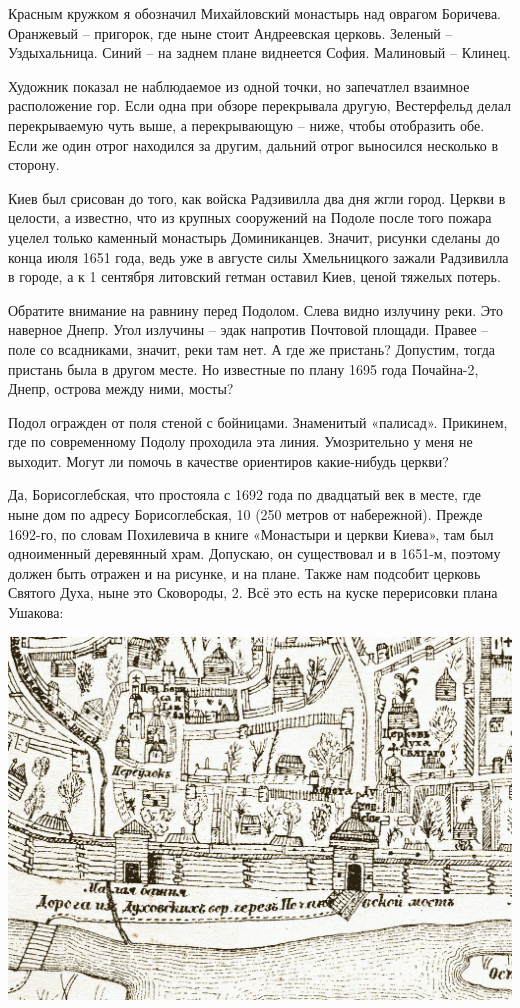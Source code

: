 Красным кружком я обозначил Михайловский монастырь над оврагом Боричева. Оранжевый – пригорок, где ныне стоит Андреевская церковь. Зеленый – Уздыхальница. Синий – на заднем плане виднеется София. Малиновый – Клинец.

Художник показал не наблюдаемое из одной точки, но запечатлел взаимное расположение гор. Если одна при обзоре перекрывала другую, Вестерфельд делал перекрываемую чуть выше, а перекрывающую – ниже, чтобы отобразить обе. Если же один отрог находился за другим, дальний отрог выносился несколько в сторону.

Киев был срисован до того, как войска Радзивилла два дня жгли город. Церкви в целости, а известно, что из крупных сооружений на Подоле после того пожара уцелел только каменный монастырь Доминиканцев. Значит, рисунки сделаны до конца июля 1651 года, ведь уже в августе силы Хмельницкого зажали Радзивилла в городе, а к 1 сентября литовский гетман оставил Киев, ценой тяжелых потерь.

Обратите внимание на равнину перед Подолом. Слева видно излучину реки. Это наверное Днепр. Угол излучины – эдак напротив Почтовой площади. Правее – поле со всадниками, значит, реки там нет. А где же пристань? Допустим, тогда пристань была в другом месте. Но известные по плану 1695 года Почайна-2, Днепр, острова между ними, мосты?

Подол огражден от поля стеной с бойницами. Знаменитый «палисад». Прикинем, где по современному Подолу проходила эта линия. Умозрительно у меня не выходит. Могут ли помочь в качестве ориентиров какие-нибудь церкви? 

Да, Борисоглебская, что простояла с 1692 года по двадцатый век в месте, где ныне дом по адресу Борисоглебская, 10 (250 метров от набережной). Прежде 1692-го, по словам Похилевича в книге «Монастыри и церкви Киева», там был одноименный деревянный храм. Допускаю, он существовал и в 1651-м, поэтому должен быть отражен и на рисунке, и на плане. Также нам подсобит церковь Святого Духа, ныне это Сковороды, 2. Всё это есть на куске перерисовки плана Ушакова: 

\begin{center}
\includegraphics[width=\linewidth]{chast-colebanie-osnov/gora-zamkovaya-valovaya/boris.jpg}
\end{center}

